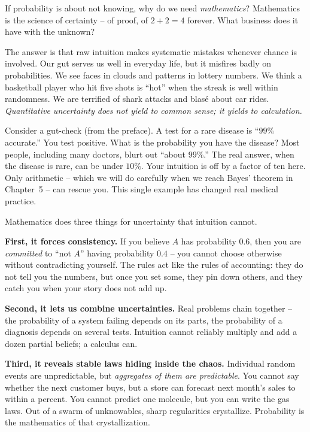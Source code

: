 If probability is about not knowing, why do we need \emph{mathematics}? Mathematics is the science of certainty -- of proof, of $2+2=4$
forever. What business does it have with the unknown?

The answer is that raw intuition makes systematic mistakes whenever chance is
involved. Our gut serves us well in everyday life, but it misfires badly on
probabilities. We see faces in clouds and patterns in lottery numbers.
We think a basketball player who hit five shots is ``hot'' when the streak is well
within randomness. We are terrified of shark attacks and blas\'e about car rides.
\emph{Quantitative uncertainty does not yield to common sense; it yields to calculation.}

\begin{intuitionbox}
Consider a gut-check (from the preface). A test for a
rare disease is ``$99\%$ accurate.'' You test positive. What is the probability
you have the disease? Most people, including many doctors, blurt out ``about
$99\%$.'' The real answer, when the disease is rare, can be under $10\%$. Your
intuition is off by a factor of ten here. Only
arithmetic -- which we will do carefully when we reach Bayes' theorem in
Chapter~5 -- can rescue you. This single example has changed real medical
practice.
\end{intuitionbox}

Mathematics does three things for uncertainty that intuition cannot.

\textbf{First, it forces consistency.} If you believe $A$ has probability $0.6$,
then you are \emph{committed} to ``not $A$'' having probability $0.4$ -- you cannot
choose otherwise without contradicting yourself. The rules act like the rules of
accounting: they do not tell you the numbers, but once you set some, they pin down
others, and they catch you when your story does not add up.

\textbf{Second, it lets us combine uncertainties.} Real problems chain together --
the probability of a system failing depends on its parts, the probability of a
diagnosis depends on several tests. Intuition cannot reliably multiply and add a
dozen partial beliefs; a calculus can.

\textbf{Third, it reveals stable laws hiding inside the chaos.} Individual random
events are unpredictable, but \emph{aggregates of them are
predictable}. You cannot say whether the next customer buys, but a store can
forecast next month's sales to within a percent. You cannot predict one molecule,
but you can write the gas laws. Out of a swarm of unknowables, sharp regularities
crystallize. Probability is the mathematics of that crystallization.

